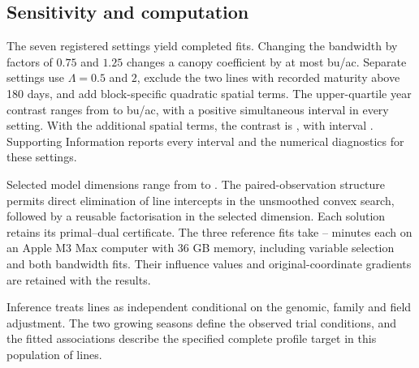 \subsection{Sensitivity and computation}

The seven registered settings yield \SoyFits{} completed fits.
Changing the bandwidth by factors of $0.75$ and $1.25$ changes a canopy
coefficient by at most \SoyBandwidthChange{} bu/ac. Separate settings
use $\Lambda=0.5$ and $2$, exclude the two lines with recorded maturity
above 180 days, and add block-specific quadratic spatial terms.
The upper-quartile year contrast ranges from \SoyYearContrastMinimum{}
to \SoyYearContrastMaximum{} bu/ac, with a positive simultaneous
interval in every setting. With the additional spatial terms, the
contrast is \SoySpatialYearContrast{}, with interval
\SoySpatialYearContrastInterval{}.
Supporting Information reports every interval and the numerical
diagnostics for these settings.

Selected model dimensions range from \SoyMinSelected{} to
\SoyMaxSelected{}. The paired-observation structure permits direct
elimination of line intercepts in the unsmoothed convex search,
followed by a reusable factorisation in the selected dimension.
Each solution retains its primal--dual certificate. The three
reference fits take \SoyReferenceMinMinutes{}--\SoyReferenceMaxMinutes{}
minutes each on an Apple M3 Max computer with 36 GB memory, including variable selection and
both bandwidth fits. Their influence values and original-coordinate
gradients are retained with the results.

Inference treats lines as independent conditional on the genomic,
family and field adjustment. The two growing seasons define the
observed trial conditions, and the fitted associations describe the
specified complete profile target in this population of lines.
